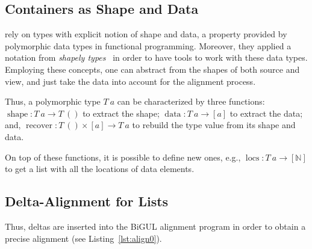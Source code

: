 \documentclass[preprint,numbers]{sigplanconf}
\DeclareMathOperator{\data}{data}
\DeclareMathOperator{\shape}{shape}
\DeclareMathOperator{\recover}{recover}
\DeclareMathOperator{\locs}{locs}
\begin{document}

\subsection{Containers as Shape and Data}

\citet{Pacheco2012} rely on types with explicit notion of shape and data, a
property provided by polymorphic data types in functional programming.
Moreover, they applied a notation from \emph{shapely types}~\cite{jay1995} in
order to have tools to work with these data types.
Employing these concepts, one can abstract from the shapes of both source and
view, and just take the data into account for the alignment process.

Thus, a polymorphic type \(T~a\) can be characterized by three functions:
\(\shape : T~a \rightarrow T~()\) to extract the shape;
\(\data : T~a \rightarrow [a]\) to extract the data;
and, \(\recover : T~() \times [a] \rightarrow T~a\) to rebuild the type value
from its shape and data.

On top of these functions, it is possible to define new ones, e.g., \(\locs :
T~a \rightarrow [\mathbb{N}]\) to get a list with all the locations of data
elements.

\subsection{Delta-Alignment for Lists}

Thus, deltas are inserted into the BiGUL alignment program in order to obtain a
precise alignment (see Listing~\ref{lst:align0}).
\end{document}
